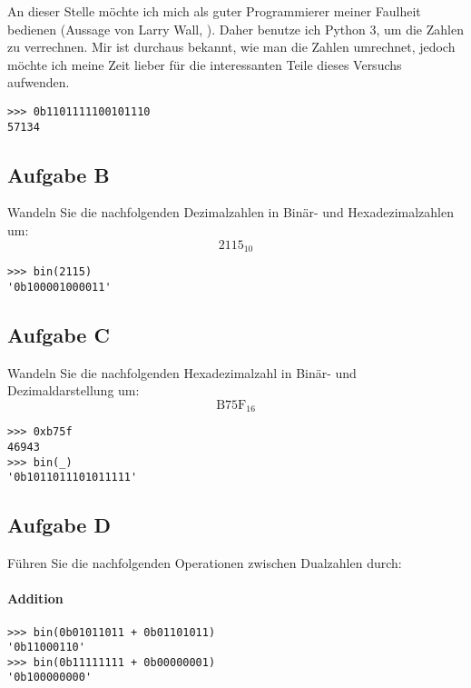 An dieser Stelle möchte ich mich als guter Programmierer meiner Faulheit
bedienen (Aussage von Larry Wall, \cite{threevirtues.com}). Daher benutze ich
Python 3, um die Zahlen zu verrechnen. Mir ist durchaus bekannt, wie man die
Zahlen umrechnet, jedoch möchte ich meine Zeit lieber für die interessanten
Teile dieses Versuchs aufwenden.

\begin{verbatim}
>>> 0b1101111100101110
57134
\end{verbatim}

\subsection{Aufgabe B}

\begin{problem}
	Wandeln Sie die nachfolgenden Dezimalzahlen in Binär- und Hexadezimalzahlen
	um:
	\[
		2115_{10}
	\]
\end{problem}

\begin{verbatim}
>>> bin(2115)
'0b100001000011'
\end{verbatim}

\subsection{Aufgabe C}

\begin{problem}
	Wandeln Sie die nachfolgenden Hexadezimalzahl in Binär- und
	Dezimaldarstellung um:
	\[
		\mathrm{B75F}_{16}
	\]
\end{problem}

\begin{verbatim}
>>> 0xb75f
46943
>>> bin(_)
'0b1011011101011111'
\end{verbatim}

\subsection{Aufgabe D}

\begin{problem}
	Führen Sie die nachfolgenden Operationen zwischen Dualzahlen durch:
\end{problem}

\paragraph{Addition}

\begin{verbatim}
>>> bin(0b01011011 + 0b01101011)
'0b11000110'
>>> bin(0b11111111 + 0b00000001)
'0b100000000'
\end{verbatim}

